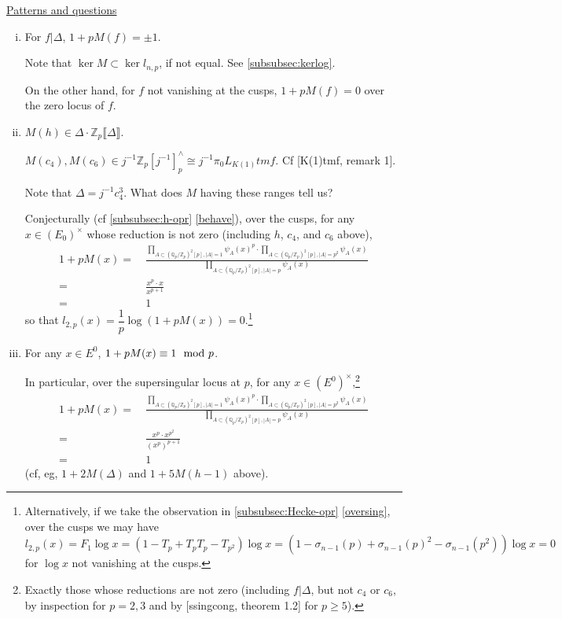 \documentclass{rs}
\theoremstyle{definition}
\theoremstyle{remark}
\newcommand{\mb}[1]{\mathbb{#1}}
\newcommand{\BQ}{{\mb Q}}
\newcommand{\BZ}{{\mb Z}}
\newcommand{\md}{~~{\rm mod}~}
\renewcommand{\D}{\Delta}
\newcommand{\si}{\sigma}
\newcommand{\lb}{\llbracket}
\newcommand{\rb}{\rrbracket}
\renewcommand{\=}{\approx}
\renewcommand{\-}{\sim}
\numberwithin{equation}{section}
\numberwithin{thm}{section}
\begin{document}
\underline{Patterns and questions}
\begin{enumerate}[(i)]
 \item For $f|\D$, $1 + p M(f) = \pm 1$.  

 Note that $\ker M \subset \ker l_{n,p}$, if not equal.  See \ref{subsubsec:kerlog}.  

 On the other hand, for $f$ not vanishing at the cusps, 
 $1 + p M(f) = 0$ over the zero locus of $f$.  

 \item \label{Mvalues} $M(h) \in \D \cdot \BZ_p \lb \D \rb$.  
 
 $M(c_4), M(c_6) \in j^{-1} \BZ_p [j^{-1}]^\wedge_p \cong j^{-1} \pi_0 L_{K(1)} tmf$.  Cf [K(1)tmf, remark 1].  

 Note that $\D = j^{-1} c_4^3$.  What does $M$ having these ranges tell us?  

 Conjecturally (cf \ref{subsubsec:h-opr} \eqref{behave}), over the cusps, for any $x \in (E_0)^\times$ whose reduction is not zero (including $h$, $c_4$, and $c_6$ above), 
 \begin{equation*}
  \begin{split}
   1 + p M(x) = & ~ \frac{\prod_{A \subset (\BQ_p/\BZ_p)^2 [p], |A| = 1} \psi_A(x)^p \cdot 
                    \prod_{A \subset (\BQ_p/\BZ_p)^2 [p], |A| = p^2} \psi_A(x)}{\prod_{A \subset (\BQ_p/\BZ_p)^2 [p], |A| = p} \psi_A(x)} \\
              = & ~ \frac{x^p \cdot x}{x^{p + 1}} \\
              = & ~ 1 
  \end{split}
 \end{equation*}
 so that $l_{2,p}(x) = \dfrac{1}{p} \log(1 + p M(x)) = 0$.\footnote{Alternatively, 
 if we take the observation in \ref{subsubsec:Hecke-opr} \eqref{oversing}, over the cusps we may have 
 \[
  l_{2,p}(x) = F_1 \log x = (1 - T_p + T_p T_p - T_{p^2}) \log x = (1 - \si_{n - 1}(p) + 
  \si_{n - 1}(p)^2 - \si_{n - 1}(p^2)) \log x = 0 
 \]
 for $\log x$ not vanishing at the cusps.  }  

 \item \label{intssing} For any $x \in E^0$, $1 + p M(x) \equiv 1 \md p$.  

 In particular, over the supersingular locus at $p$, 
 for any $x \in (E^0)^\times$,\footnote{Exactly those whose reductions are not zero 
 (including $f|\D$, but not $c_4$ or $c_6$, by inspection for $p = 2, 3$ and by [ssingcong, theorem 1.2] for $p \geq 5$).  } 
 \begin{equation*}
  \begin{split}
   1 + p M(x) = & ~ \frac{\prod_{A \subset (\BQ_p/\BZ_p)^2 [p], |A| = 1} \psi_A(x)^p \cdot 
                    \prod_{A \subset (\BQ_p/\BZ_p)^2 [p], |A| = p^2} \psi_A(x)}{\prod_{A \subset (\BQ_p/\BZ_p)^2 [p], |A| = p} \psi_A(x)} \\
              = & ~ \frac{x^p \cdot x^{p^2}}{(x^p)^{p + 1}} \\
              = & ~ 1 
  \end{split}
 \end{equation*}
 (cf, eg, $1 + 2 M(\D)$ and $1 + 5 M(h - 1)$ above).  
\end{enumerate}
\end{document}
